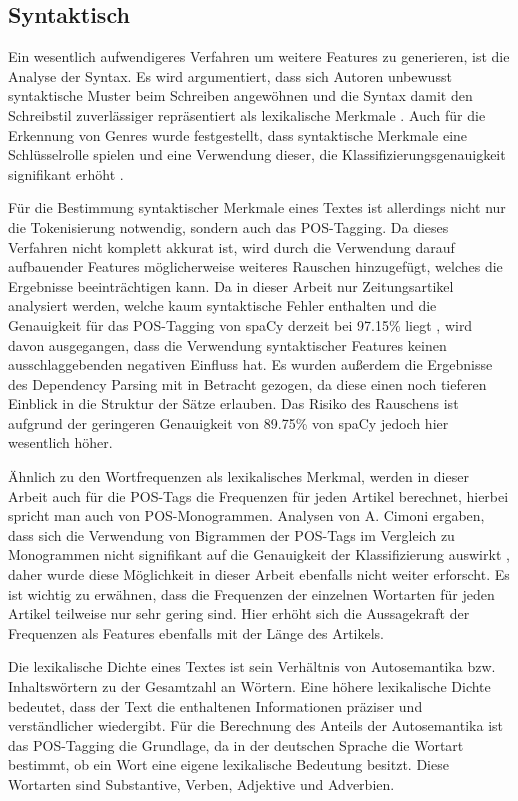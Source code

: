 \subsection{Syntaktisch}
Ein wesentlich aufwendigeres Verfahren um weitere Features zu generieren, ist die Analyse der Syntax. Es wird argumentiert, dass sich Autoren unbewusst syntaktische Muster beim Schreiben angewöhnen und die Syntax damit den Schreibstil zuverlässiger repräsentiert als lexikalische Merkmale \cite[S.~542]{stamatatos2009survey}. Auch für die Erkennung von Genres wurde festgestellt, dass syntaktische Merkmale eine Schlüsselrolle spielen und eine Verwendung dieser, die Klassifizierungsgenauigkeit signifikant erhöht \cite{cimino2017identifying}.

Für die Bestimmung syntaktischer Merkmale eines Textes ist allerdings nicht nur die Tokenisierung notwendig, sondern auch das POS-Tagging. Da dieses Verfahren nicht komplett akkurat ist, wird durch die Verwendung darauf aufbauender Features möglicherweise weiteres Rauschen hinzugefügt, welches die Ergebnisse beeinträchtigen kann. Da in dieser Arbeit nur Zeitungsartikel analysiert werden, welche kaum syntaktische Fehler enthalten und die Genauigkeit für das POS-Tagging von spaCy derzeit bei 97.15\% liegt \cite{spacyAccuracy}, wird davon ausgegangen, dass die Verwendung syntaktischer Features keinen ausschlaggebenden negativen Einfluss hat. Es wurden außerdem die Ergebnisse des Dependency Parsing mit in Betracht gezogen, da diese einen noch tieferen Einblick in die Struktur der Sätze erlauben. Das Risiko des Rauschens ist aufgrund der geringeren Genauigkeit von 89.75\% von spaCy \cite{spacyAccuracy} jedoch hier wesentlich höher.

Ähnlich zu den Wortfrequenzen als lexikalisches Merkmal, werden in dieser Arbeit auch für die POS-Tags die Frequenzen für jeden Artikel berechnet, hierbei spricht man auch von POS-Monogrammen. Analysen von A. Cimoni ergaben, dass sich die Verwendung von Bigrammen der POS-Tags im Vergleich zu Monogrammen nicht signifikant auf die Genauigkeit der Klassifizierung auswirkt \cite{cimino2017identifying}, daher wurde diese Möglichkeit in dieser Arbeit ebenfalls nicht weiter erforscht. Es ist wichtig zu erwähnen, dass die Frequenzen der einzelnen Wortarten für jeden Artikel teilweise nur sehr gering sind. Hier erhöht sich die Aussagekraft der Frequenzen als Features ebenfalls mit der Länge des Artikels.

Die lexikalische Dichte eines Textes ist sein Verhältnis von Autosemantika bzw. Inhaltswörtern zu der Gesamtzahl an Wörtern. Eine höhere lexikalische Dichte bedeutet, dass der Text die enthaltenen Informationen präziser und verständlicher wiedergibt. Für die Berechnung des Anteils der Autosemantika ist das POS-Tagging die Grundlage, da in der deutschen Sprache die Wortart bestimmt, ob ein Wort eine eigene lexikalische Bedeutung besitzt. Diese Wortarten sind Substantive, Verben, Adjektive und Adverbien.

